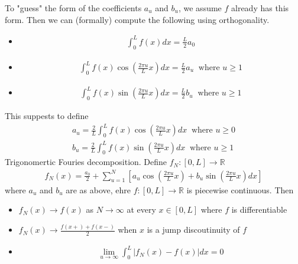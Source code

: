 To "guess" the form of the coefficients $a_u$ and $b_u$, we assume $f$ already has this form. Then we can (formally) compute the following using orthogonality. 
\begin{itemize}
    \item \begin{align*}
        \int_0^L f(x) dx = \frac{L}{2}a_0
    \end{align*}
    \item \begin{align*}
        \int_0^L f(x) \cos(\frac{2 \pi u}{L}x)dx = \frac{L}{2}a_u \ \text{ where } u \geq 1
    \end{align*}
    \item \begin{align*}
        \int_0^L f(x) \sin(\frac{2 \pi u}{L}x)dx = \frac{L}{2}b_u \ \text{ where } u \geq 1
    \end{align*}
\end{itemize}
This suppests to define 
\begin{align*}
    a_u = \frac{2}{L} \int_0^L f(x) \cos(\frac{2 \pi u}{L}x)dx \ \text{ where } u \geq 0 \\
    b_u = \frac{2}{L} \int_0^L f(x) \sin(\frac{2 \pi u}{L}x)dx \ \text{ where } u \geq 1
\end{align*}
Trigonomertic Fouries decomposition. Define $f_N: [0,L] \rightarrow \mathbb{R}$
\begin{align*}
    f_N(x) = \frac{a_0}{2} + \sum_{u=1}^N [a_u \cos(\frac{2 \pi u}{L}x) + b_u \sin(\frac{2 \pi u}{L}x)dx]
\end{align*}
where $a_u$ and $b_u$ are as above, ehre $f: [0,L] \rightarrow \mathbb{R}$ is piecewise continuous. Then 
\begin{itemize}
    \item $f_N(x) \rightarrow f(x)$ as $N \rightarrow \infty$ at every $x \in [0,L]$ where $f$ is differentiable
    \item $f_N(x) \rightarrow \frac{f(x+) + f(x-)}{2}$ when $x$ is a jump discoutinuity of $f$
    \item \begin{align*} \lim_{u\rightarrow \infty} \int_0^L|f_N(x)-f(x)|dx = 0 \end{align*}
\end{itemize}

